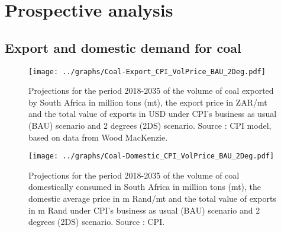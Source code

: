 \documentclass[12pt,english]{article}
\begin{document}
\section{Prospective analysis}\label{prospective}

\subsection{Export and domestic demand for coal}



\begin{figure}[!t]
	\centering
	\texttt{[image: ../graphs/Coal-Export\_CPI\_VolPrice\_BAU\_2Deg.pdf]}
	\caption{\label{Coal-Export_CPI_VolPrice_BAU_2DS}\small Projections for the period 2018-2035 of the volume of coal exported by South Africa in million tons (mt), the export price in ZAR/mt and the total value of exports in USD under CPI's business as usual (BAU) scenario and 2 degrees (2DS) scenario. Source : CPI model, based on data from Wood MacKenzie.}
\end{figure}

\begin{figure}[!t]
	\centering
	\texttt{[image: ../graphs/Coal-Domestic\_CPI\_VolPrice\_BAU\_2Deg.pdf]}
	\caption{\label{Coal-Domestic_CPI_VolPrice_BAU_2DS}\small Projections for the period 2018-2035 of the volume of coal domestically consumed in South Africa in million tons (mt), the domestic average price in m Rand/mt and the total value of exports in m Rand under CPI's business as usual (BAU) scenario and 2 degrees (2DS) scenario. Source : CPI.}
\end{figure}
\end{document}
